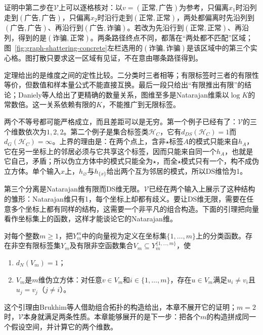 证明中第二步在$\mathcal V$上可以逐格核对：以$v=(\text{正常},\text{广告})$为参考，只偏离$x_1$时沿列走到$(\text{广告},\text{广告})$，只偏离$x_2$时沿行走到$(\text{正常},\text{正常})$，两处都偏离时先沿列到$(\text{广告},\text{广告})$、再沿行到$(\text{广告},\text{诈骗})$。若改为先沿行到$(\text{正常},\text{正常})$、再沿列，得到的是$(\text{诈骗},\text{正常})$。两条路径终点不同，都落在“两处都不匹配”区域；图~\ref{fig:graph-shattering-concrete}左栏选用的$(\text{诈骗},\text{诈骗})$是该区域中的第三个实心格。图打散只要求这一区域有见证，不在意由哪条路径得到。

定理给出的是维度之间的定性比较。二分类时三者相等；有限标签时三者的有限性等价，但数值和样本量公式不能直接互换。最后一段只给出“有限推出有限”的结论；Daniely等人给出了更精确的数量关系，图维至多是Natarajan维乘以$\log K$的常数倍。这一关系依赖有限的$K$，不能推广到无限标签。

两个不等号都可能严格成立，而且差距可以是无穷。第一个例子已经有了：$\mathcal V$的三个维数依次为$1,2,2$。第二个例子是集合标签类$\mathcal H_C$，它有$d_{DS}(\mathcal H_C)=1$而$d_G(\mathcal H_C)=\infty$。上界的理由是：在两个点上，含非$\star$标签$A$的模式只能来自$h_A$，它在另一坐标上的邻居必须与它共享这个标签，因而只能来自同一个$h_A$，也就是它自己，矛盾；所以伪立方体中的模式只能全为$\star$，而全$\star$模式只有一个，构不成伪立方体。单个输入$x$上，$h_\varnothing$与$h_{\{x\}}$给出两个互为邻居的模式，所以DS维恰为1。

第三个分离是Natarajan维有限而DS维无限。$\mathcal V$已经在两个输入上展示了这种结构的雏形：Natarajan维只有1，每个坐标上却都有歧义。要让DS维无限，需要在任意多个坐标上都有同样的结构，这需要一个非平凡的组合构造。下面的引理把向量看作坐标集上的函数，这样才能谈论它的Natarajan维。

\begin{lemma}[低Natarajan维的局部邻接构造]
\label{lem:low-natarajan-pseudocubes}
对每个整数$m\geq1$，把$Y_m^m$中的向量视为定义在坐标集$\{1,\ldots,m\}$上的分类函数。存在非空有限标签集$Y_m$及有限非空函数集合$V_m\subseteq Y_m^{\{1,\ldots,m\}}$，使
\begin{enumerate}
 \item $d_N(V_m)=1$；
 \item $V_m$是$m$维伪立方体：对任意$v\in V_m$和$i\in\{1,\ldots,m\}$，存在$u\in V_m$满足$u_i\neq v_i$且$u_j=v_j$（$j\neq i$）。
\end{enumerate}
\end{lemma}

这个引理由Brukhim等人借助组合拓扑的构造给出，本章不展开它的证明；$m=2$时，$\mathcal V$本身就满足两条性质。本章能够展开的是下一步：把各个$m$的构造拼成同一个假设空间，并计算它的两个维数。

